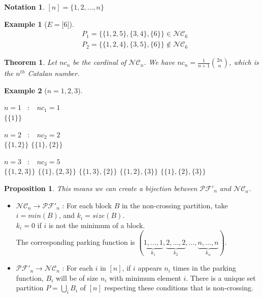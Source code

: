 \documentclass[12pt]{report}
\newtheorem{theorem}{Theorem}
\newtheorem*{prop}{Proposition}
\newtheorem*{example}{Example}
\newtheorem*{notation}{Notation}
\begin{document}
\begin{notation}
    $[n] = \{1, 2, \ldots, n\}$
\end{notation}

\begin{example}[$E = \lbrack 6 \rbrack $]
    \begin{align*}
        &P_1 = \{\{1, 2, 5\}, \{3, 4\}, \{6\}\} \in \mathcal{NC}_6\\
        &P_2 = \{\{1, 2, 4\}, \{3, 5\}, \{6\}\} \notin \mathcal{NC}_6
    \end{align*}
\end{example}

\begin{theorem}
    Let $nc_n$ be the cardinal of $\mathcal{NC}_n$.
    We have $nc_n = \frac{1}{n + 1} \binom{2n}{n}$,
    which is the $n^{th}$ Catalan number.
\end{theorem}

\begin{example}[$n = 1, 2, 3$]
    ~\\
    \begin{itemize*}
        \item $n = 1$ \  $:$ \  $nc_1 = 1$\\
        \subitem $\{\{1\}\}$\\
        \item $n = 2$ \  $:$ \  $nc_2 = 2$\\
        \subitem $\{\{1, 2\}\}$
        \subitem $\{\{1\}, \{2\}\}$\\
        \item $n = 3$ \  $:$ \  $nc_3 = 5$\\
        \subitem $\{\{1, 2, 3\}\}$
        \subitem $\{\{1\}, \{2, 3\}\}$
        \subitem $\{\{1, 3\}, \{2\}\}$
        \subitem $\{\{1, 2\}, \{3\}\}$
        \subitem $\{\{1\}, \{2\}, \{3\}\}$\\
    \end{itemize*}
\end{example}

\begin{prop}
    This means we can create a \emph{bijection} between
    $\mathcal{PF'}_n$ and $\mathcal{NC}_n$.
\end{prop}

\begin{itemize}
    \item $\mathcal{NC}_n \to \mathcal{PF'}_n$ :
    For each block $B$ in the non-crossing partition, take
    $i = min (B)$, and $k_i = size (B)$.\\
    $k_i = 0$ if $i$ is not the minimum of a block.\\
    The corresponding parking function is
    $(\underbrace{1, \ldots, 1}_{k_1}, \underbrace{2, \ldots,
    2}_{k_2}, \ldots, \underbrace{n, \ldots, n}_{k_n})$.\\
    \item $\mathcal{PF'}_n \to \mathcal{NC}_n$ :
    For each $i$ in $[n]$, if $i$ appears $n_i$ times in the
    parking function, $B_i$ will be of size $n_i$ with minimum
    element $i$.
    There is a unique set partition $\displaystyle P = \bigcup_{i}{B_i}$
    of $[n]$ respecting these conditions that is non-crossing.
\end{itemize}
\end{document}
